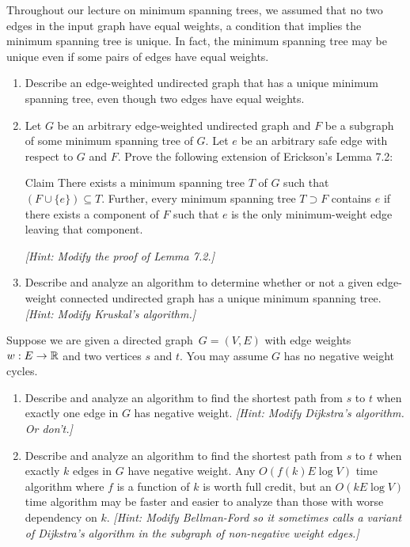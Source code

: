 \documentclass[11pt]{article}
\begin{document}
\begin{problems}
\item
  Throughout our lecture on minimum spanning trees, we assumed that no two edges in the input graph
  have equal weights, a condition that implies the minimum spanning tree is unique.
  In fact, the minimum spanning tree may be unique even if some pairs of edges have equal weights.
  \begin{enumerate}
    \item
      Describe an edge-weighted undirected graph that has a unique minimum spanning tree, even
      though two edges have equal weights.
    \item
      Let \(G\) be an arbitrary edge-weighted undirected graph and \(F\) be a subgraph of
      some minimum spanning tree of \(G\).
      Let \(e\) be an arbitrary safe edge with respect to \(G\) and \(F\).
      Prove the following extension of Erickson's Lemma 7.2:
      \begin{oneshot}{Claim}
        There exists a minimum spanning tree \(T\) of \(G\) such that \((F \cup \{e\}) \subseteq
        T\).
        Further, every minimum spanning tree \(T \supset F\) contains \(e\) if there exists a
        component of \(F\) such that \(e\) is the only minimum-weight edge leaving that component.
      \end{oneshot}

      \emph{[Hint: Modify the proof of Lemma 7.2.]}
    \item
      Describe and analyze an algorithm to determine whether or not a given edge-weight connected
      undirected graph has a unique minimum spanning tree.
      \emph{[Hint: Modify Kruskal's algorithm.]}
  \end{enumerate}

\item
  Suppose we are given a directed graph~\(G = (V, E)\) with edge weights \(w : E \to \R\) and two
  vertices \(s\) and \(t\).
  You may assume \(G\) has no negative weight cycles.
  \begin{enumerate}
    \item
      Describe and analyze an algorithm to find the shortest path from \(s\) to \(t\) when exactly
      one edge in \(G\) has negative weight.
      \emph{[Hint: Modify Dijkstra's algorithm.
      Or don't.]}

    \item
      Describe and analyze an algorithm to find the shortest path from \(s\) to \(t\) when exactly
      \(k\) edges in \(G\) have negative weight.
      Any \(O(f(k) E \log V)\) time algorithm where \(f\) is a function of \(k\) is worth full
      credit, but an \(O(k E \log V)\) time algorithm may be faster and easier to analyze than those
      with worse dependency on \(k\).
      \emph{[Hint: Modify Bellman-Ford so it sometimes calls a variant of Dijkstra's algorithm in
      the subgraph of non-negative weight edges.]}
  \end{enumerate}


\end{problems}
\end{document}

